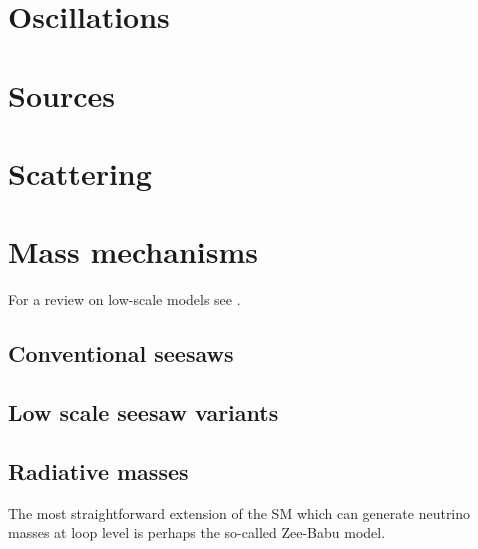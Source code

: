 
\section{Oscillations}

\section{Sources}

\section{Scattering}

\section{Mass mechanisms}

For a review on low-scale models see \cite{Boucenna:2014zba}.

\subsection{Conventional seesaws}

\subsection{Low scale seesaw variants}

\subsection{Radiative masses}

The most straightforward extension of the SM which can generate neutrino masses at loop level is perhaps the so-called Zee-Babu model.